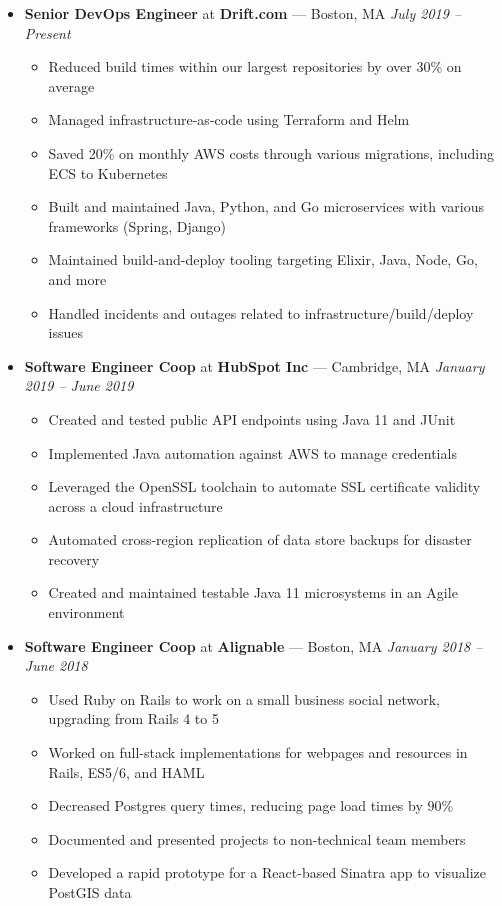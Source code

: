 \documentclass{article}
\begin{document}
\begin{itemize}[label={},leftmargin=*]
  \item \textbf{Senior DevOps Engineer} at \textbf{Drift.com} --- Boston, MA \hfill {\em July 2019 -- Present}
  \begin{itemize}[label={$\bullet$}]
    \item Reduced build times within our largest repositories by over 30\% on average
    \item Managed infrastructure-as-code using Terraform and Helm
    \item Saved 20\% on monthly AWS costs through various migrations, including ECS to Kubernetes
    \item Built and maintained Java, Python, and Go microservices with various frameworks (Spring, Django)
    \item Maintained build-and-deploy tooling targeting Elixir, Java, Node, Go, and more
    \item Handled incidents and outages related to infrastructure/build/deploy issues
  \end{itemize}

  \item \textbf{Software Engineer Coop} at \textbf{HubSpot Inc} --- Cambridge, MA \hfill {\em January 2019 -- June 2019}
  \begin{itemize}[label={$\bullet$}]
    \item Created and tested public API endpoints using Java 11 and JUnit
    \item Implemented Java automation against AWS to manage credentials
    \item Leveraged the OpenSSL toolchain to automate SSL certificate validity across a cloud infrastructure
    \item Automated cross-region replication of data store backups for disaster recovery
    \item Created and maintained testable Java 11 microsystems in an Agile environment
  \end{itemize}

  \item \textbf{Software Engineer Coop} at \textbf{Alignable} --- Boston, MA \hfill {\em January 2018 -- June 2018}
  \begin{itemize}[label={$\bullet$}]
    \item Used Ruby on Rails to work on a small business social network, upgrading from Rails 4 to 5
    \item Worked on full-stack implementations for webpages and resources in Rails, ES5/6, and HAML
    \item Decreased Postgres query times, reducing page load times by 90\%
    \item Documented and presented projects to non-technical team members
    \item Developed a rapid prototype for a React-based Sinatra app to visualize PostGIS data
  \end{itemize}


\end{itemize}
\end{document}
